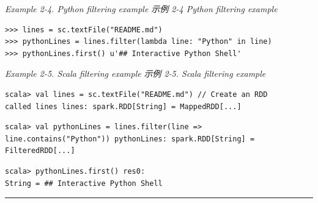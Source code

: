 \emph{Example 2-4. Python filtering example \textbar{}\textbar{} 示例
2-4 Python filtering example}

\begin{lstlisting}
>>> lines = sc.textFile("README.md")
>>> pythonLines = lines.filter(lambda line: "Python" in line)
>>> pythonLines.first() u'## Interactive Python Shell'
\end{lstlisting}

\emph{Example 2-5. Scala filtering example} \emph{示例 2-5. Scala
filtering example}

\begin{lstlisting}
scala> val lines = sc.textFile("README.md") // Create an RDD
called lines lines: spark.RDD[String] = MappedRDD[...]
\end{lstlisting}

\begin{lstlisting}
scala> val pythonLines = lines.filter(line =>
line.contains("Python")) pythonLines: spark.RDD[String] = FilteredRDD[...]
\end{lstlisting}

\begin{lstlisting}
scala> pythonLines.first() res0:
String = ## Interactive Python Shell
\end{lstlisting}

\begin{center}\rule{0.5\linewidth}{\linethickness}\end{center}

